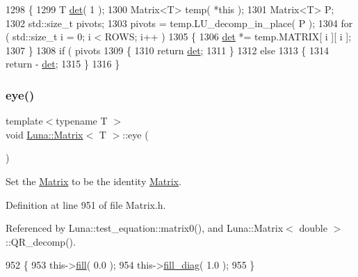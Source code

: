 \begin{DoxyCode}
1298   \{
1299     T \hyperlink{classLuna_1_1Matrix_ab1325b95f71885bfaabeeeb875bef542}{det}( 1 );
1300     Matrix<T> temp( *\textcolor{keyword}{this} );
1301     Matrix<T> P;
1302     std::size\_t pivots;
1303     pivots = temp.LU\_decomp\_in\_place( P );
1304     \textcolor{keywordflow}{for} ( std::size\_t i = 0; i < ROWS; i++ )
1305     \{
1306       \hyperlink{classLuna_1_1Matrix_ab1325b95f71885bfaabeeeb875bef542}{det} *= temp.MATRIX[ i ][ i ];
1307     \}
1308     \textcolor{keywordflow}{if} ( pivots %
1309     \{
1310       \textcolor{keywordflow}{return} \hyperlink{classLuna_1_1Matrix_ab1325b95f71885bfaabeeeb875bef542}{det};
1311     \}
1312     \textcolor{keywordflow}{else}
1313     \{
1314       \textcolor{keywordflow}{return} - \hyperlink{classLuna_1_1Matrix_ab1325b95f71885bfaabeeeb875bef542}{det};
1315     \}
1316   \}
\end{DoxyCode}
\mbox{\label{classLuna_1_1Matrix_a1b5fc5d3bfd1b03e04def5d314174be6}} 
\subsubsection{\texorpdfstring{eye()}{eye()}}
{\footnotesize\ttfamily template$<$typename T $>$ \\
void \hyperlink{classLuna_1_1Matrix}{Luna\+::\+Matrix}$<$ T $>$\+::eye (\begin{DoxyParamCaption}{ }\end{DoxyParamCaption})\hspace{0.3cm}{\ttfamily [inline]}}



Set the \hyperlink{classLuna_1_1Matrix}{Matrix} to be the identity \hyperlink{classLuna_1_1Matrix}{Matrix}. 



Definition at line 951 of file Matrix.\+h.



Referenced by Luna\+::test\+\_\+equation\+::matrix0(), and Luna\+::\+Matrix$<$ double $>$\+::\+Q\+R\+\_\+decomp().


\begin{DoxyCode}
952   \{
953     this->\hyperlink{classLuna_1_1Matrix_ad6e6dbb7290a74bda17629dc5440328d}{fill}( 0.0 );
954     this->\hyperlink{classLuna_1_1Matrix_a0e75d89d4a7a85d403922f4b7fac623d}{fill\_diag}( 1.0 );
955   \}
\end{DoxyCode}
\mbox{\label{classLuna_1_1Matrix_ad6e6dbb7290a74bda17629dc5440328d}} 
